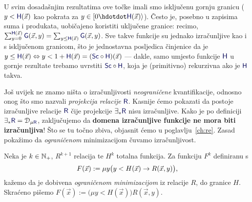 \begin{napomena}[{name=[granice mogu biti i uključene]}]\label{nap:kvantSc}
U svim dosadašnjim rezultatima ove točke imali smo isključenu gornju granicu ($y<\f H(\vec x)$ kao pokrata za $y\in[0\dd \f H(\vec x)\rangle$). Često je, posebno u zapisima suma i produkata, uobičajeno koristiti uključene granice: recimo, $\sum_{y=0}^{\f H(\vec x)}\f G(\vec x,y)=\sum_{y\le\f H(\vec x)}\f G(\vec x,y)$. Sve takve funkcije su jednako izračunljive kao i s isključenom granicom, što je jednostavna posljedica činjenice da je $y\le\f H(\vec x)\Leftrightarrow y<1+\f H(\vec x)=(\f{Sc}\circ\f H)(\vec x)$ --- dakle, samo umjesto funkcije $\f H$ u gornje rezultate trebamo uvrstiti $\f{Sc}\circ\f H$, koja je (primitivno) rekurzivna ako je $\f H$ takva.
%
\end{napomena}

Još uvijek ne znamo ništa o izračunljivosti \emph{neograničene} kvantifikacije, odnosno onog što smo nazvali \emph{projekcija relacije} $\f R$. Kasnije ćemo pokazati da postoje izračunljive relacije $\f R$ čije projekcije $\exists_*\f R$ nisu izračunljive. Kako je po definiciji $\exists_*\f R=\dom{\mu\f R}$, zaključujemo da \textbf{domena izračunljive funkcije ne mora biti izračunljiva}! Što se tu točno zbiva, objasnit ćemo u poglavlju~\ref{ch:re}. Zasad pokažimo da \emph{ograničenom} minimizacijom čuvamo izračunljivost.


\begin{definicija}[{name=[ograničena minimizacija]}]
Neka je $k\in{\mathbb N}_+$, $R^{k+1}$ relacija te $H^k$ totalna funkcija. Za funkciju $F^k$ definiranu s
\begin{equation}
    F(\vec x):=\mu y\bigl(y<H(\vec x)\to R(\vec x,y)\bigr)\text,
\end{equation}
kažemo da je dobivena \emph{ograničenom minimizacijom} iz relacije $R$, do granice $H$. Skraćeno pišemo $F(\vec x):=\bigl(\mu y<H(\vec x)\bigr)R(\vec x,y)$.
\end{definicija}

